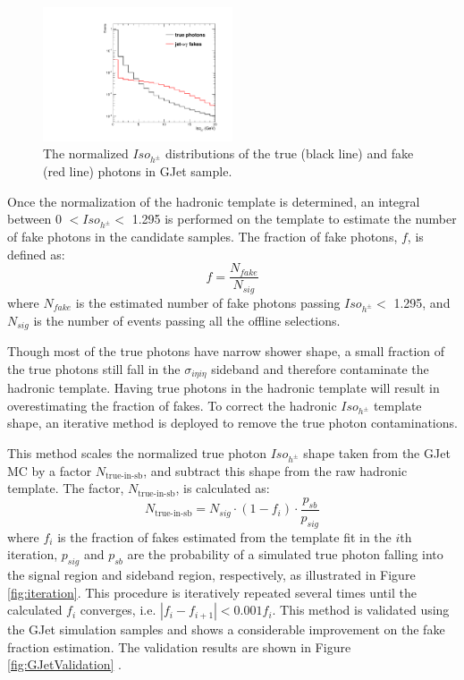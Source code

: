 \documentclass[thesis.tex]{subfiles}
\renewcommand\_{\textunderscore\allowbreak}
\begin{document}
\begin{figure}[hbt]
  \centering
    \includegraphics[width=0.5\textwidth]{Figures/PLOT_JetPhoTemplate.pdf}
  \caption{The normalized $Iso_{h^\pm}$ distributions of the true (black line) and fake (red line) photons in GJet sample.}
    \label{fig:fakeinGJet}
\end{figure}

Once the normalization of the hadronic template is determined, an integral between 0 $< Iso_{h^\pm} <$ 1.295 is performed on the template to estimate the number of fake photons in the candidate samples. The fraction of fake photons, $f$, is defined as: 
\begin{equation}
		f = \frac{N_{fake}}{N_{sig}}
\end{equation}
where $N_{fake}$ is the estimated number of fake photons passing $Iso_{h^\pm} < $ 1.295, and $N_{sig}$ is the number of events passing all the offline selections. 

Though most of the true photons have narrow shower shape, a small fraction of the true photons still fall in the $\sigma_{i\eta i\eta}$ sideband and therefore contaminate the hadronic template. Having true photons in the hadronic template will result in overestimating the fraction of fakes. To correct the hadronic $Iso_{h^\pm}$ template shape, an iterative method is deployed to remove the true photon contaminations.

This method scales the normalized true photon $Iso_{h^\pm}$ shape taken from the GJet MC by a factor $N_\textrm{true-in-sb}$, and subtract this shape from the raw hadronic template. The factor, $N_\textrm{true-in-sb}$,  is calculated as:
\begin{equation}
		N_\textrm{true-in-sb} = N_{sig} \cdot (1-f_i) \cdot \frac{p_{sb}}{p_{sig}}
\end{equation}
where $f_i$ is the fraction of fakes estimated from the template fit in the $i$th iteration, $p_{sig}$ and $p_{sb}$ are the probability of a simulated true photon falling into the signal region and sideband region, respectively, as illustrated in Figure \ref{fig:iteration}. This procedure is iteratively repeated several times until the calculated $f_i$ converges, i.e. $|f_i - f_{i+1}| < 0.001f_i$. This method is validated using the GJet simulation samples and shows a considerable improvement on the fake fraction estimation. The validation results are shown in Figure \ref{fig:GJetValidation} .
\end{document}
